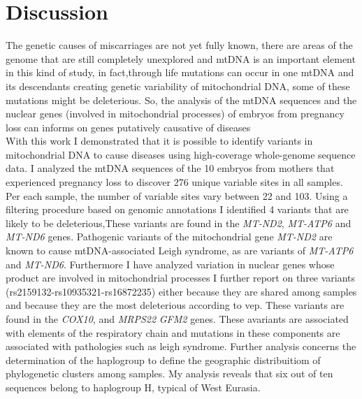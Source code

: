 \chapter{Discussion}
The genetic causes of miscarriages are not yet fully known, there are areas of the genome that are still completely unexplored and  mtDNA is an important element in this kind of study, in fact,through life mutations can occur in one mtDNA and its descendants creating genetic variability of mitochondrial DNA, some of these mutations might be deleterious. So, the analysis of the mtDNA sequences and the nuclear genes (involved in mitochondrial processes) of embryos from pregnancy loss can informs on genes putatively causative of diseases \\

 With this work I demonstrated that it is possible to identify variants in mitochondrial DNA to cause diseases using high-coverage whole-genome sequence data.
 I analyzed the mtDNA sequences of the 10 embryos from mothers that experienced pregnancy loss to discover 276 unique variable sites in all samples. Per each sample, the number of variable sites vary between 22 and 103. Using a filtering procedure  based on genomic annotations I identified 4 variants that are likely to be deleterious,These variants are found in the \textit {MT-ND2}, \textit{MT-ATP6} and \textit{MT-ND6} genes. 
Pathogenic variants of the mitochondrial gene \textit{MT-ND2} are known to cause mtDNA-associated Leigh syndrome, as are variants of \textit{MT-ATP6} and \textit{MT-ND6}. 
Furthermore I have analyzed variation in nuclear genes whose product are involved in mitochondrial processes  
I further report on three variants (rs2159132-rs10935321-rs16872235) either because they are shared among samples and because they are the most deleterious according to vep. These variants are found in the \textit{COX10}, and \textit{MRPS22} \textit{GFM2} genes.
These avariants are associated with elements of the respiratory chain and mutations in these components are associated with pathologies such as leigh syndrome.
Further analysis concerns the determination of the haplogroup to 
define the geographic distribuitiom of phylogenetic clusters among
samples. My analysis reveals that six out of ten sequences belong to
haplogroup H, typical of West Eurasia.  


